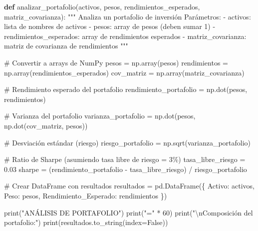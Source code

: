 \documentclass[
  doc,
  floatsintext,
  longtable,
  a4paper,
  nolmodern,
  notxfonts,
  notimes,
  12pt,
  colorlinks=true,linkcolor=blue,citecolor=blue,urlcolor=blue]{apa7}
\newenvironment{Shaded}{\begin{snugshade}}{\end{snugshade}}
\newcommand{\BuiltInTok}[1]{\textcolor[rgb]{0.00,0.23,0.31}{#1}}
\newcommand{\CharTok}[1]{\textcolor[rgb]{0.13,0.47,0.30}{#1}}
\newcommand{\CommentTok}[1]{\textcolor[rgb]{0.37,0.37,0.37}{#1}}
\newcommand{\DecValTok}[1]{\textcolor[rgb]{0.68,0.00,0.00}{#1}}
\newcommand{\FloatTok}[1]{\textcolor[rgb]{0.68,0.00,0.00}{#1}}
\newcommand{\KeywordTok}[1]{\textcolor[rgb]{0.00,0.23,0.31}{\textbf{#1}}}
\newcommand{\NormalTok}[1]{\textcolor[rgb]{0.00,0.23,0.31}{#1}}
\newcommand{\OperatorTok}[1]{\textcolor[rgb]{0.37,0.37,0.37}{#1}}
\newcommand{\StringTok}[1]{\textcolor[rgb]{0.13,0.47,0.30}{#1}}
\newcommand{\VariableTok}[1]{\textcolor[rgb]{0.07,0.07,0.07}{#1}}
\begin{document}
\begin{Shaded}
\begin{Highlighting}[]
\KeywordTok{def}\NormalTok{ analizar\_portafolio(activos, pesos, rendimientos\_esperados, matriz\_covarianza):}
    \CommentTok{"""}
\CommentTok{    Analiza un portafolio de inversión}
\CommentTok{    }
\CommentTok{    Parámetros:}
\CommentTok{    {-} activos: lista de nombres de activos}
\CommentTok{    {-} pesos: array de pesos (deben sumar 1)}
\CommentTok{    {-} rendimientos\_esperados: array de rendimientos esperados}
\CommentTok{    {-} matriz\_covarianza: matriz de covarianza de rendimientos}
\CommentTok{    """}
    
    \CommentTok{\# Convertir a arrays de NumPy}
\NormalTok{    pesos }\OperatorTok{=}\NormalTok{ np.array(pesos)}
\NormalTok{    rendimientos }\OperatorTok{=}\NormalTok{ np.array(rendimientos\_esperados)}
\NormalTok{    cov\_matriz }\OperatorTok{=}\NormalTok{ np.array(matriz\_covarianza)}
    
    \CommentTok{\# Rendimiento esperado del portafolio}
\NormalTok{    rendimiento\_portafolio }\OperatorTok{=}\NormalTok{ np.dot(pesos, rendimientos)}
    
    \CommentTok{\# Varianza del portafolio}
\NormalTok{    varianza\_portafolio }\OperatorTok{=}\NormalTok{ np.dot(pesos, np.dot(cov\_matriz, pesos))}
    
    \CommentTok{\# Desviación estándar (riesgo)}
\NormalTok{    riesgo\_portafolio }\OperatorTok{=}\NormalTok{ np.sqrt(varianza\_portafolio)}
    
    \CommentTok{\# Ratio de Sharpe (asumiendo tasa libre de riesgo = 3\%)}
\NormalTok{    tasa\_libre\_riesgo }\OperatorTok{=} \FloatTok{0.03}
\NormalTok{    sharpe }\OperatorTok{=}\NormalTok{ (rendimiento\_portafolio }\OperatorTok{{-}}\NormalTok{ tasa\_libre\_riesgo) }\OperatorTok{/}\NormalTok{ riesgo\_portafolio}
    
    \CommentTok{\# Crear DataFrame con resultados}
\NormalTok{    resultados }\OperatorTok{=}\NormalTok{ pd.DataFrame(\{}
        \StringTok{\textquotesingle{}Activo\textquotesingle{}}\NormalTok{: activos,}
        \StringTok{\textquotesingle{}Peso\textquotesingle{}}\NormalTok{: pesos,}
        \StringTok{\textquotesingle{}Rendimiento\_Esperado\textquotesingle{}}\NormalTok{: rendimientos}
\NormalTok{    \})}
    
    \BuiltInTok{print}\NormalTok{(}\StringTok{"ANÁLISIS DE PORTAFOLIO"}\NormalTok{)}
    \BuiltInTok{print}\NormalTok{(}\StringTok{"="} \OperatorTok{*} \DecValTok{60}\NormalTok{)}
    \BuiltInTok{print}\NormalTok{(}\StringTok{"}\CharTok{\textbackslash{}n}\StringTok{Composición del portafolio:"}\NormalTok{)}
    \BuiltInTok{print}\NormalTok{(resultados.to\_string(index}\OperatorTok{=}\VariableTok{False}\NormalTok{))}
    

\end{Highlighting}
\end{Shaded}
\end{document}
